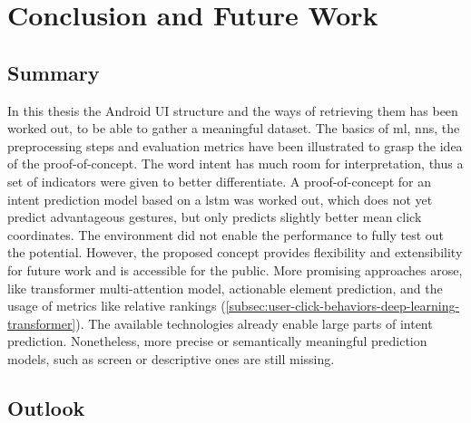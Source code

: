\chapter{Conclusion and Future Work}
\label{sec:conclusion}

\section*{Summary}

In this thesis the Android UI structure and the ways of retrieving them has been worked out, to be able to gather a meaningful dataset.
The basics of \gls{ml}, \gls{nn}s, the preprocessing steps and evaluation metrics have been illustrated to grasp the idea of the proof-of-concept.
The word intent has much room for interpretation, thus a set of indicators were given to better differentiate.
A proof-of-concept for an intent prediction model based on a \gls{lstm} was worked out, which does not yet predict advantageous gestures, but only predicts slightly better mean click coordinates.
The environment did not enable the performance to fully test out the potential.
However, the proposed concept provides flexibility and extensibility for future work and is accessible for the public.
More promising approaches arose, like transformer multi-attention model, actionable element prediction, and the usage of metrics like relative rankings (\ref{subsec:user-click-behaviors-deep-learning-transformer}).
The available technologies already enable large parts of intent prediction.
Nonetheless, more precise or semantically meaningful prediction models, such as screen or descriptive ones are still missing.

\section*{Outlook}

